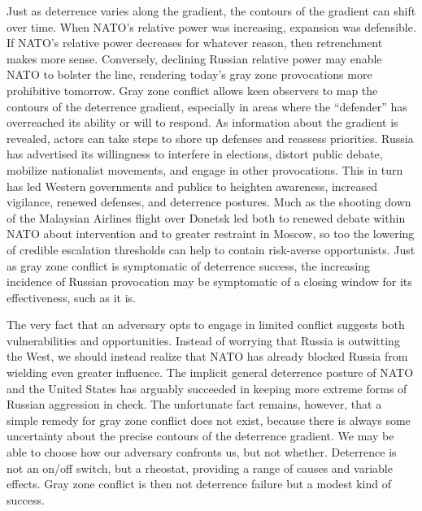 \documentclass[bibtex, autowc]{apsr_submission}
\begin{document}
Just as deterrence varies along the gradient, the contours of the gradient can shift over time. When NATO’s relative power was increasing, expansion was defensible. If NATO’s relative power decreases for whatever reason, then retrenchment makes more sense. Conversely, declining Russian relative power may enable NATO to bolster the line, rendering today’s gray zone provocations more prohibitive tomorrow. Gray zone conflict allows keen observers to map the contours of the deterrence gradient, especially in areas where the ``defender'' has overreached its ability or will to respond. As information about the gradient is revealed, actors can take steps to shore up defenses and reassess priorities. Russia has advertised its willingness to interfere in elections, distort public debate, mobilize nationalist movements, and engage in other provocations. This in turn has led Western governments and publics to heighten awareness, increased vigilance, renewed defenses, and deterrence postures. Much as the shooting down of the Malaysian Airlines flight over Donetsk led both to renewed debate within NATO about intervention and to greater restraint in Moscow, so too the lowering of credible escalation thresholds can help to contain risk-averse opportunists. Just as gray zone conflict is symptomatic of deterrence success, the increasing incidence of Russian provocation may be symptomatic of a closing window for its effectiveness, such as it is.

The very fact that an adversary opts to engage in limited conflict suggests both vulnerabilities and opportunities. Instead of worrying that Russia is outwitting the West, we should instead realize that NATO has already blocked Russia from wielding even greater influence. The implicit general deterrence posture of NATO and the United States has arguably succeeded in keeping more extreme forms of Russian aggression in check. The unfortunate fact remains, however, that a simple remedy for gray zone conflict does not exist, because there is always some uncertainty about the precise contours of the deterrence gradient. We may be able to choose how our adversary confronts us, but not whether. Deterrence is not an on/off switch, but a rheostat, providing a range of causes and variable effects. Gray zone conflict is then not deterrence failure but a modest kind of success. 


\end{document}
